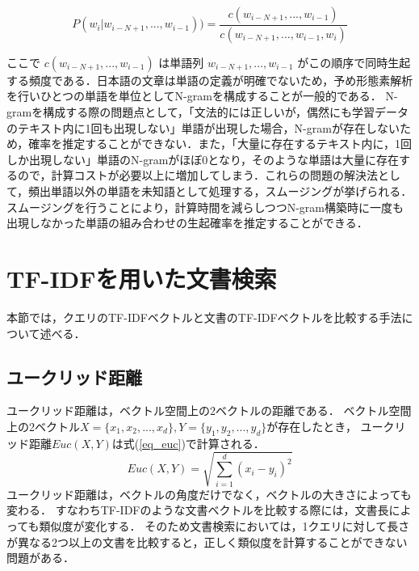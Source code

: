 \begin{equation}
    P(w_i|w_{i-N+1}, ..., w_{i-1})) = \frac{ c(w_{i-N+1}, ..., w_{i-1}) }{ c(w_{i-N+1}, ..., w_{i-1}, w_i) }  
    \label{onkyo_model2}
\end{equation}

ここで $c(w_{i-N+1}, ..., w_{i-1})$ は単語列 $w_{i-N+1}, ..., w_{i-1}$ がこの順序で同時生起する頻度である．日本語の文章は単語の定義が明確でないため，予め形態素解析を行いひとつの単語を単位としてN-gramを構成することが一般的である． 
N-gramを構成する際の問題点として，「文法的には正しいが，偶然にも学習データのテキスト内に1回も出現しない」単語が出現した場合，N-gramが存在しないため，確率を推定することができない．また，「大量に存在するテキスト内に，1回しか出現しない」単語のN-gramがほぼ0となり，そのような単語は大量に存在するので，計算コストが必要以上に増加してしまう．これらの問題の解決法として，頻出単語以外の単語を未知語として処理する，スムージングが挙げられる．スムージング\cite{ngram_smooth1}を行うことにより，計算時間を減らしつつN-gram構築時に一度も出現しなかった単語の組み合わせの生起確率を推定することができる．

%
%


\section{TF-IDFを用いた文書検索} \label{sec_tfidf}
本節では，クエリのTF-IDFベクトルと文書のTF-IDFベクトルを比較する手法について述べる．
\subsection{ユークリッド距離}
ユークリッド距離は，ベクトル空間上の2ベクトルの距離である．
ベクトル空間上の2ベクトル$X = \{x_1, x_2, ..., x_d\}, Y = \{y_1, y_2, ..., y_d\}$が存在したとき，
ユークリッド距離$Euc(X, Y)$は式(\ref{eq_euc})で計算される．
\begin{equation}
    Euc(X, Y) = \sqrt{\sum^{d}_{i=1}{(x_i - y_i)^2}}    \label{eq_euc}
\end{equation}
ユークリッド距離は，ベクトルの角度だけでなく，ベクトルの大きさによっても変わる．
すなわちTF-IDFのような文書ベクトルを比較する際には，文書長によっても類似度が変化する．
そのため文書検索においては，1クエリに対して長さが異なる2つ以上の文書を比較すると，正しく類似度を計算することができない問題がある．

